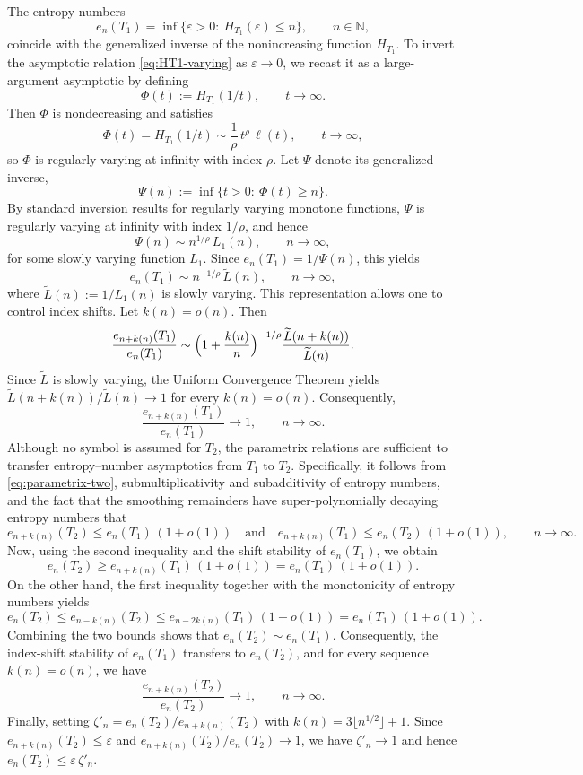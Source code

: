 \documentclass[a4paper,12pt]{article}
\begin{document}
The entropy numbers 
\[
e_n(T_1) =\inf\{\varepsilon>0:\ H_{T_1}(\varepsilon)\le n\},
\qquad n\in\mathbb{N},
\]
coincide with the generalized inverse of the nonincreasing function
$H_{T_1}$.
To invert the asymptotic relation \eqref{eq:HT1-varying} as $\varepsilon\to0$,
we recast it as a large-argument asymptotic by defining
\[
\Phi(t):=H_{T_1}(1/t),\qquad t\to\infty.
\]
Then $\Phi$ is nondecreasing and satisfies
\[
\Phi(t)=H_{T_1}(1/t)\sim \frac{1}{\rho}\,t^{\rho}\,\ell(t),
\qquad t\to\infty,
\]
so $\Phi$ is regularly varying at infinity with index $\rho$.
Let $\Psi$ denote its generalized inverse,
\[
\Psi(n):=\inf\{t>0:\ \Phi(t)\ge n\}.
\]
By standard inversion results for regularly varying monotone functions,
$\Psi$ is regularly varying at infinity with index $1/\rho$, and hence
\[
\Psi(n)\sim n^{1/\rho}\,L_1(n),
\qquad n\to\infty,
\]
for some slowly varying function $L_1$.
Since $e_n(T_1)=1/\Psi(n)$, this yields
\[
e_n(T_1)\sim n^{-1/\rho}\,\widetilde L(n),
\qquad n\to\infty,
\]
where $\widetilde L(n):=1/L_1(n)$ is slowly varying.
This representation allows one to control index shifts.
Let $k(n)=o(n)$.
Then
\[
\frac{e_{n+k(n)}(T_1)}{e_n(T_1)}
\sim
\Bigl(1+\frac{k(n)}{n}\Bigr)^{-1/\rho}
\frac{\widetilde L(n+k(n))}{\widetilde L(n)}.
\]
Since $\widetilde L$ is slowly varying, the Uniform Convergence Theorem
\cite[Theorem~1.2.1]{binghamRegularVariation1987} yields
$\widetilde L(n+k(n))/\widetilde L(n)\to 1$ for every $k(n)=o(n)$.
Consequently,
\[
\frac{e_{n+k(n)}(T_1)}{e_n(T_1)}\to 1,
\qquad n\to\infty.
\]
Although no symbol is assumed for $T_2$, the parametrix relations are sufficient to
transfer entropy–number asymptotics from $T_1$ to $T_2$.
Specifically, it follows from \eqref{eq:parametrix-two}, 
submultiplicativity and subadditivity of entropy numbers, and the fact that the smoothing remainders
have super-polynomially decaying entropy numbers that
\[
e_{n+k(n)}(T_2)\le e_n(T_1)\,(1+o(1))
\quad\text{and}\quad
e_{n+k(n)}(T_1)\le e_n(T_2)\,(1+o(1)),
\qquad n\to\infty.
\]
Now, using the second inequality and the shift stability of $e_n(T_1)$, we obtain
\[
e_n(T_2)\ge e_{n+k(n)}(T_1)\,(1+o(1))
= e_n(T_1)\,(1+o(1)).
\]
On the other hand, the first inequality together with the monotonicity of entropy
numbers yields
\[
e_n(T_2)\le e_{n-k(n)}(T_2)\le e_{n-2k(n)}(T_1)\,(1+o(1))
= e_n(T_1)\,(1+o(1)).
\]
Combining the two bounds shows that $e_n(T_2)\sim e_n(T_1)$.
Consequently, the index-shift stability of $e_n(T_1)$ transfers to $e_n(T_2)$, and
for every sequence $k(n)=o(n)$, we have 
\[
\frac{e_{n+k(n)}(T_2)}{e_n(T_2)}\to 1,
\qquad n\to\infty.
\]
Finally, setting $\zeta'_n = e_n(T_2)/e_{n+k(n)}(T_2)$ with $k(n)=3\lfloor n^{1/2}\rfloor+1$.
Since $e_{n+k(n)}(T_2)\le\varepsilon$ and $e_{n+k(n)}(T_2)/e_n(T_2)\to1$, we have
$\zeta'_n\to1$ and hence $e_n(T_2)\le \varepsilon\,\zeta'_n$.
\end{document}
